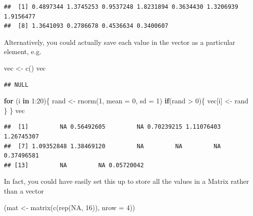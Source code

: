 \documentclass[
]{book}
\newenvironment{Shaded}{\begin{snugshade}}{\end{snugshade}}
\newcommand{\AttributeTok}[1]{\textcolor[rgb]{0.77,0.63,0.00}{#1}}
\newcommand{\ConstantTok}[1]{\textcolor[rgb]{0.00,0.00,0.00}{#1}}
\newcommand{\ControlFlowTok}[1]{\textcolor[rgb]{0.13,0.29,0.53}{\textbf{#1}}}
\newcommand{\DecValTok}[1]{\textcolor[rgb]{0.00,0.00,0.81}{#1}}
\newcommand{\FunctionTok}[1]{\textcolor[rgb]{0.00,0.00,0.00}{#1}}
\newcommand{\NormalTok}[1]{#1}
\newcommand{\OtherTok}[1]{\textcolor[rgb]{0.56,0.35,0.01}{#1}}
\newcommand{\SpecialCharTok}[1]{\textcolor[rgb]{0.00,0.00,0.00}{#1}}
\theoremstyle{definition}
\theoremstyle{definition}
\theoremstyle{definition}
\theoremstyle{definition}
\theoremstyle{remark}
\begin{document}
\begin{verbatim}
##  [1] 0.4897344 1.3745253 0.9537248 1.8231894 0.3634430 1.3206939 1.9156477
##  [8] 1.3641093 0.2786678 0.4536634 0.3400607
\end{verbatim}

Alternatively, you could actually save each value in the vector as a particular element, e.g.

\begin{Shaded}
\begin{Highlighting}[]
\NormalTok{vec }\OtherTok{\textless{}{-}} \FunctionTok{c}\NormalTok{()}
\NormalTok{vec}
\end{Highlighting}
\end{Shaded}

\begin{verbatim}
## NULL
\end{verbatim}

\begin{Shaded}
\begin{Highlighting}[]
\ControlFlowTok{for}\NormalTok{ (i }\ControlFlowTok{in} \DecValTok{1}\SpecialCharTok{:}\DecValTok{20}\NormalTok{)\{}
\NormalTok{  rand }\OtherTok{\textless{}{-}} \FunctionTok{rnorm}\NormalTok{(}\DecValTok{1}\NormalTok{, }\AttributeTok{mean =} \DecValTok{0}\NormalTok{, }\AttributeTok{sd =} \DecValTok{1}\NormalTok{)}
  \ControlFlowTok{if}\NormalTok{(rand }\SpecialCharTok{\textgreater{}} \DecValTok{0}\NormalTok{)\{}
\NormalTok{    vec[i] }\OtherTok{\textless{}{-}}\NormalTok{ rand}
\NormalTok{  \}}
\NormalTok{\}}
\NormalTok{vec}
\end{Highlighting}
\end{Shaded}

\begin{verbatim}
##  [1]         NA 0.56492605         NA 0.70239215 1.11076403 1.26745307
##  [7] 1.09352848 1.38469120         NA         NA         NA 0.37496581
## [13]         NA         NA 0.05720042
\end{verbatim}

In fact, you could have easily set this up to store all the values in a Matrix rather than a vector

\begin{Shaded}
\begin{Highlighting}[]
\NormalTok{(mat }\OtherTok{\textless{}{-}} \FunctionTok{matrix}\NormalTok{(}\FunctionTok{c}\NormalTok{(}\FunctionTok{rep}\NormalTok{(}\ConstantTok{NA}\NormalTok{, }\DecValTok{16}\NormalTok{)), }\AttributeTok{nrow =} \DecValTok{4}\NormalTok{))}
\end{Highlighting}
\end{Shaded}
\end{document}
